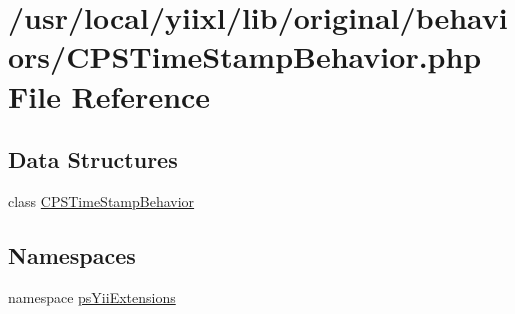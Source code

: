 \hypertarget{CPSTimeStampBehavior_8php}{
\section{/usr/local/yiixl/lib/original/behaviors/CPSTimeStampBehavior.php File Reference}
\label{CPSTimeStampBehavior_8php}
}
\subsection*{Data Structures}
\begin{DoxyCompactItemize}
\item 
class \hyperlink{classCPSTimeStampBehavior}{CPSTimeStampBehavior}
\end{DoxyCompactItemize}
\subsection*{Namespaces}
\begin{DoxyCompactItemize}
\item 
namespace \hyperlink{namespacepsYiiExtensions}{psYiiExtensions}
\end{DoxyCompactItemize}

